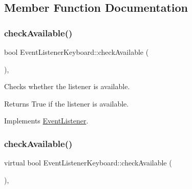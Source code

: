 \subsection{Member Function Documentation}
\mbox{\label{classEventListenerKeyboard_a7f7d0c2e82388278bfc98ff457dc2da8}} 
\subsubsection{\texorpdfstring{check\+Available()}{checkAvailable()}\hspace{0.1cm}{\footnotesize\ttfamily [1/2]}}
{\footnotesize\ttfamily bool Event\+Listener\+Keyboard\+::check\+Available (\begin{DoxyParamCaption}{ }\end{DoxyParamCaption})\hspace{0.3cm}{\ttfamily [override]}, {\ttfamily [virtual]}}

Checks whether the listener is available.

\begin{DoxyReturn}{Returns}
True if the listener is available. 
\end{DoxyReturn}


Implements \hyperlink{classEventListener_adf9e4eb37ea6e94c05f4d1b6594bd35e}{Event\+Listener}.

\mbox{\label{classEventListenerKeyboard_a855c94e047e48d3ab419ae43280231c3}} 
\subsubsection{\texorpdfstring{check\+Available()}{checkAvailable()}\hspace{0.1cm}{\footnotesize\ttfamily [2/2]}}
{\footnotesize\ttfamily virtual bool Event\+Listener\+Keyboard\+::check\+Available (\begin{DoxyParamCaption}{ }\end{DoxyParamCaption})\hspace{0.3cm}{\ttfamily [override]}, {\ttfamily [virtual]}}

